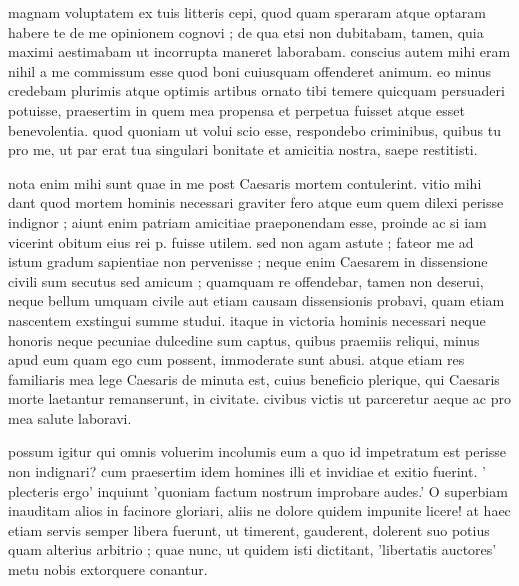 


 magnam voluptatem ex tuis litteris cepi, quod quam speraram atque optaram habere te de me opinionem cognovi ; de qua etsi non dubitabam, tamen, quia maximi aestimabam ut incorrupta maneret laborabam. conscius autem mihi eram nihil a me commissum esse quod boni cuiusquam offenderet animum. eo minus credebam plurimis atque optimis artibus ornato tibi temere quicquam persuaderi potuisse, praesertim in quem mea propensa et perpetua fuisset atque esset benevolentia. quod quoniam ut volui scio esse, respondebo criminibus, quibus tu pro me, ut par erat tua singulari bonitate et amicitia nostra, saepe restitisti.

 nota enim mihi sunt quae in me post Caesaris mortem contulerint. vitio mihi dant quod mortem hominis necessari graviter fero atque eum quem dilexi perisse indignor ; aiunt enim patriam amicitiae praeponendam esse, proinde ac si iam vicerint obitum eius rei p. fuisse utilem. sed non agam astute ; fateor me ad istum gradum sapientiae non pervenisse ; neque enim Caesarem in dissensione civili sum secutus sed amicum ; quamquam re offendebar, tamen non deserui, neque bellum umquam civile aut etiam causam dissensionis probavi, quam etiam nascentem exstingui summe studui. itaque in victoria hominis necessari neque honoris neque pecuniae dulcedine sum captus, quibus praemiis reliqui, minus apud eum quam ego cum possent, immoderate sunt abusi. atque etiam res familiaris mea lege Caesaris de minuta est, cuius beneficio plerique, qui Caesaris morte laetantur remanserunt, in civitate. civibus victis ut parceretur aeque ac pro mea salute laboravi.

 possum igitur qui omnis voluerim incolumis eum a quo id impetratum est perisse non indignari? cum praesertim idem homines illi et invidiae et exitio fuerint. ' plecteris ergo' inquiunt 'quoniam factum nostrum improbare audes.' O superbiam inauditam alios in facinore gloriari, aliis ne dolore quidem impunite licere! at haec etiam servis semper libera fuerunt, ut timerent, gauderent, dolerent suo potius quam alterius arbitrio ; quae nunc, ut quidem isti dictitant, 'libertatis auctores' metu nobis extorquere conantur.

